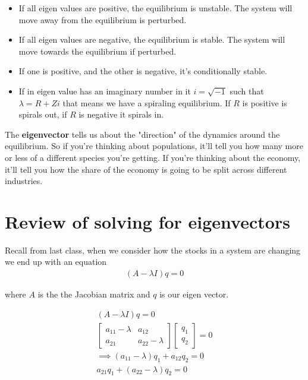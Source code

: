 \documentclass{article}
\begin{document}
\begin{itemize}
    \item If all eigen values are positive, the equilibrium is unstable. The system will move away from the equilibrium is perturbed.  
    \item If all eigen values are negative, the equilibrium is stable. The system will move towards the equilibrium if perturbed. 
    \item If one is positive, and the other is negative, it's conditionally stable.
    \item If in eigen value has an imaginary number in it $i = \sqrt{-1}$ such that $\lambda = R + Zi$ that means we have a spiraling equilibrium. If $R$ is positive is spirals out, if $R$ is negative it spirals in. 
\end{itemize}

The \textbf{eigenvector} tells us about the "direction" of the dynamics around the equilibrium. So if you're thinking about populations, it'll tell you how many more or less of a different species you're getting. If you're thinking about the economy, it'll tell you how the share of the economy is going to be split across different industries.


\section{Review of solving for eigenvectors}
Recall from last class, when we consider how the stocks in a system are changing we end up with an equation 
\begin{align}
    (A - \lambda I) q = 0 
\end{align}

where $A$ is the the Jacobian matrix and $q$ is our eigen vector. 

\begin{align}
    (A - \lambda I ) q = 0 \\
    \begin{bmatrix}
        a_{11} - \lambda & a_{12} \\
        a_{21} & a_{22} - \lambda
    \end{bmatrix}
    \begin{bmatrix}
        q_1 \\
        q_2
    \end{bmatrix} = 0 \\
    \implies (a_{11} - \lambda) q_1 + a_{12} q_2 = 0 \label{system} \\
    a_{21} q_1 + (a_{22} - \lambda) q_2 = 0 
\end{align}
\end{document}
